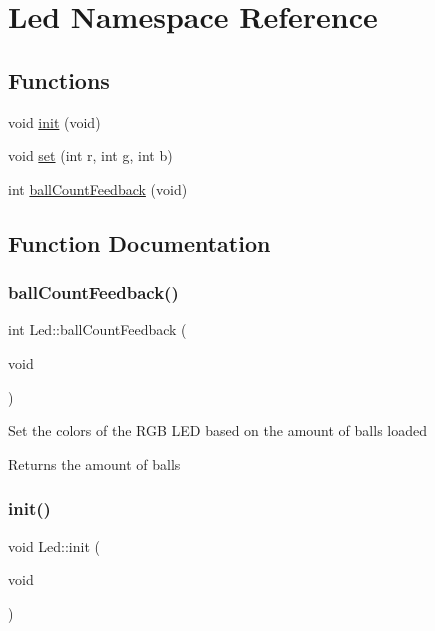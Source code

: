 \hypertarget{namespace_led}{}\section{Led Namespace Reference}
\label{namespace_led}
\subsection*{Functions}
\begin{DoxyCompactItemize}
\item 
void \mbox{\hyperlink{namespace_led_a107713861ff8f17501a422bafe5dbb6d}{init}} (void)
\item 
void \mbox{\hyperlink{namespace_led_adad3dd17f3cc5798f971fabd22a6dc79}{set}} (int r, int g, int b)
\item 
int \mbox{\hyperlink{namespace_led_a21fb94035c645deefdc29015ad8b57ad}{ball\+Count\+Feedback}} (void)
\end{DoxyCompactItemize}


\subsection{Function Documentation}
\mbox{\label{namespace_led_a21fb94035c645deefdc29015ad8b57ad}} 
\subsubsection{\texorpdfstring{ballCountFeedback()}{ballCountFeedback()}}
{\footnotesize\ttfamily int Led\+::ball\+Count\+Feedback (\begin{DoxyParamCaption}\item[{void}]{ }\end{DoxyParamCaption})}

Set the colors of the R\+GB L\+ED based on the amount of balls loaded

\begin{DoxyReturn}{Returns}
the amount of balls 
\end{DoxyReturn}
\mbox{\label{namespace_led_a107713861ff8f17501a422bafe5dbb6d}} 
\subsubsection{\texorpdfstring{init()}{init()}}
{\footnotesize\ttfamily void Led\+::init (\begin{DoxyParamCaption}\item[{void}]{ }\end{DoxyParamCaption})}

